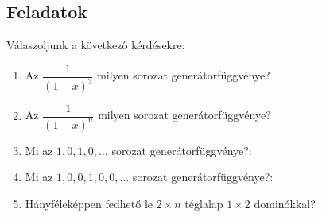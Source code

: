 \subsection*{Feladatok}
\begin{problem} Válaszoljunk a következő kérdésekre:
\begin{enumerate}
\item Az $\dfrac{1}{(1-x)^{3}}$ milyen sorozat generátorfüggvénye? 
\item Az $\dfrac{1}{(1-x)^{n}}$ milyen sorozat generátorfüggvénye? 
\item Mi az $1,0,1,0,\dots$ sorozat generátorfüggvénye?: 
\item Mi az $1,0,0,1,0,0,\dots$ sorozat generátorfüggvénye?: 
\item Hányféleképpen fedhető le $2\times n$ téglalap $1\times2$ dominókkal? 
\end{enumerate}
\end{problem}
